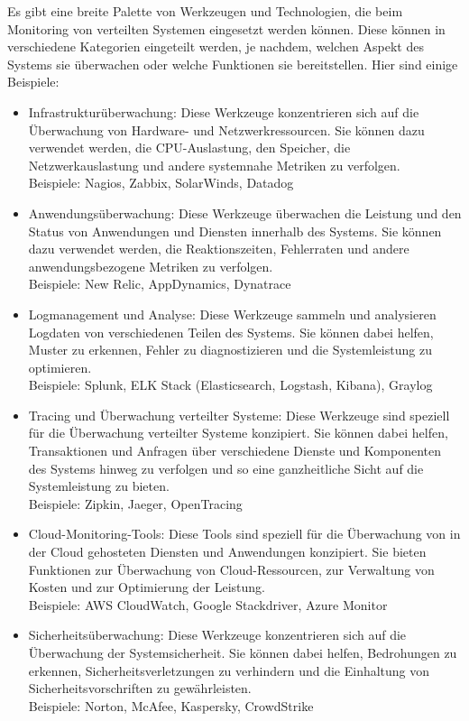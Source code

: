 Es gibt eine breite Palette von Werkzeugen und Technologien, die beim Monitoring von verteilten Systemen eingesetzt werden können. Diese können in verschiedene Kategorien eingeteilt werden, je nachdem, welchen Aspekt des Systems sie überwachen oder welche Funktionen sie bereitstellen. Hier sind einige Beispiele:
\begin{itemize}
\item Infrastrukturüberwachung: Diese Werkzeuge konzentrieren sich auf die Überwachung von Hardware- und Netzwerkressourcen. Sie können dazu verwendet werden, die CPU-Auslastung, den Speicher, die Netzwerkauslastung und andere systemnahe Metriken zu verfolgen.\\
Beispiele: Nagios, Zabbix, SolarWinds, Datadog
\item Anwendungsüberwachung: Diese Werkzeuge überwachen die Leistung und den Status von Anwendungen und Diensten innerhalb des Systems. Sie können dazu verwendet werden, die Reaktionszeiten, Fehlerraten und andere anwendungsbezogene Metriken zu verfolgen.\\
Beispiele: New Relic, AppDynamics, Dynatrace
\item Logmanagement und Analyse: Diese Werkzeuge sammeln und analysieren Logdaten von verschiedenen Teilen des Systems. Sie können dabei helfen, Muster zu erkennen, Fehler zu diagnostizieren und die Systemleistung zu optimieren.\\
Beispiele: Splunk, ELK Stack (Elasticsearch, Logstash, Kibana), Graylog
\item Tracing und Überwachung verteilter Systeme: Diese Werkzeuge sind speziell für die Überwachung verteilter Systeme konzipiert. Sie können dabei helfen, Transaktionen und Anfragen über verschiedene Dienste und Komponenten des Systems hinweg zu verfolgen und so eine ganzheitliche Sicht auf die Systemleistung zu bieten.\\
Beispiele: Zipkin, Jaeger, OpenTracing
\item Cloud-Monitoring-Tools: Diese Tools sind speziell für die Überwachung von in der Cloud gehosteten Diensten und Anwendungen konzipiert. Sie bieten Funktionen zur Überwachung von Cloud-Ressourcen, zur Verwaltung von Kosten und zur Optimierung der Leistung.\\
Beispiele: AWS CloudWatch, Google Stackdriver, Azure Monitor
\item Sicherheitsüberwachung: Diese Werkzeuge konzentrieren sich auf die Überwachung der Systemsicherheit. Sie können dabei helfen, Bedrohungen zu erkennen, Sicherheitsverletzungen zu verhindern und die Einhaltung von Sicherheitsvorschriften zu gewährleisten.\\
Beispiele: Norton, McAfee, Kaspersky, CrowdStrike
\end{itemize}
